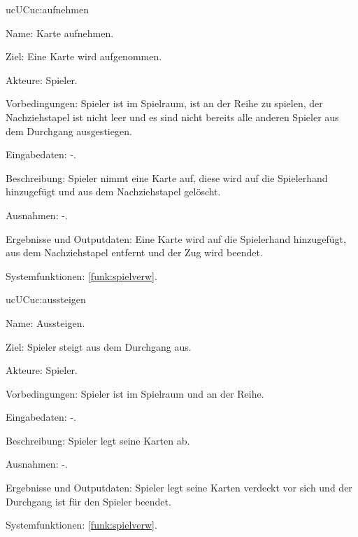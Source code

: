\begin{description}[leftmargin=5em, style=sameline]
	\begin{lhp}{uc}{UC}{uc:aufnehmen} %
		\item [Name:] Karte aufnehmen.
		\item [Ziel:] Eine Karte wird aufgenommen.
		\item [Akteure:] Spieler.
		\item [Vorbedingungen:] Spieler ist im Spielraum, ist an der Reihe zu spielen, der Nachziehstapel ist nicht leer und es sind nicht bereits alle anderen Spieler aus dem Durchgang ausgestiegen.
		\item [Eingabedaten:] -. 
		\item [Beschreibung:] Spieler nimmt eine Karte auf, diese wird auf die Spielerhand hinzugefügt und aus dem Nachziehstapel gelöscht.
		\item [Ausnahmen:] -.
		\item [Ergebnisse und Outputdaten:] Eine Karte wird auf die Spielerhand hinzugefügt, aus dem Nachziehstapel entfernt und der Zug wird beendet.	
		\item [Systemfunktionen:] \ref{funk:spielverw}. %
	\end{lhp}
    
	\begin{lhp}{uc}{UC}{uc:aussteigen} %
		\item [Name:] Aussteigen.
		\item [Ziel:] Spieler steigt aus dem Durchgang aus.
		\item [Akteure:] Spieler.
		\item [Vorbedingungen:] Spieler ist im Spielraum und an der Reihe.
		\item [Eingabedaten:] -. 
		\item [Beschreibung:] Spieler legt seine Karten ab.
		\item [Ausnahmen:] -.
		\item [Ergebnisse und Outputdaten:] Spieler legt seine Karten verdeckt vor sich und der Durchgang ist für den Spieler beendet.	
		\item [Systemfunktionen:] \ref{funk:spielverw}. %
	\end{lhp}
	

\end{description}
